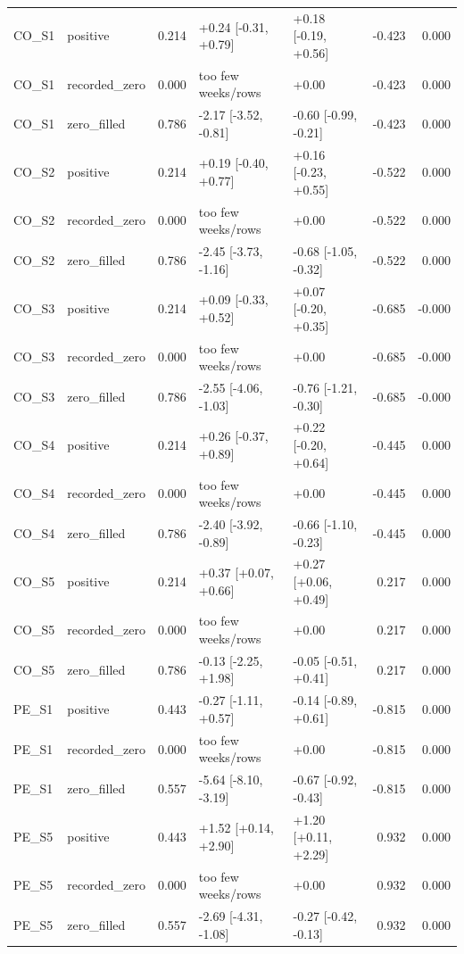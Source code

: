 \begin{tabular}{llrllrr}
CO\_S1 & positive & 0.214 & +0.24 [-0.31, +0.79] & +0.18 [-0.19, +0.56] & -0.423 & 0.000 \\
CO\_S1 & recorded\_zero & 0.000 & too few weeks/rows & +0.00 & -0.423 & 0.000 \\
CO\_S1 & zero\_filled & 0.786 & -2.17 [-3.52, -0.81] & -0.60 [-0.99, -0.21] & -0.423 & 0.000 \\
CO\_S2 & positive & 0.214 & +0.19 [-0.40, +0.77] & +0.16 [-0.23, +0.55] & -0.522 & 0.000 \\
CO\_S2 & recorded\_zero & 0.000 & too few weeks/rows & +0.00 & -0.522 & 0.000 \\
CO\_S2 & zero\_filled & 0.786 & -2.45 [-3.73, -1.16] & -0.68 [-1.05, -0.32] & -0.522 & 0.000 \\
CO\_S3 & positive & 0.214 & +0.09 [-0.33, +0.52] & +0.07 [-0.20, +0.35] & -0.685 & -0.000 \\
CO\_S3 & recorded\_zero & 0.000 & too few weeks/rows & +0.00 & -0.685 & -0.000 \\
CO\_S3 & zero\_filled & 0.786 & -2.55 [-4.06, -1.03] & -0.76 [-1.21, -0.30] & -0.685 & -0.000 \\
CO\_S4 & positive & 0.214 & +0.26 [-0.37, +0.89] & +0.22 [-0.20, +0.64] & -0.445 & 0.000 \\
CO\_S4 & recorded\_zero & 0.000 & too few weeks/rows & +0.00 & -0.445 & 0.000 \\
CO\_S4 & zero\_filled & 0.786 & -2.40 [-3.92, -0.89] & -0.66 [-1.10, -0.23] & -0.445 & 0.000 \\
CO\_S5 & positive & 0.214 & +0.37 [+0.07, +0.66] & +0.27 [+0.06, +0.49] & 0.217 & 0.000 \\
CO\_S5 & recorded\_zero & 0.000 & too few weeks/rows & +0.00 & 0.217 & 0.000 \\
CO\_S5 & zero\_filled & 0.786 & -0.13 [-2.25, +1.98] & -0.05 [-0.51, +0.41] & 0.217 & 0.000 \\
PE\_S1 & positive & 0.443 & -0.27 [-1.11, +0.57] & -0.14 [-0.89, +0.61] & -0.815 & 0.000 \\
PE\_S1 & recorded\_zero & 0.000 & too few weeks/rows & +0.00 & -0.815 & 0.000 \\
PE\_S1 & zero\_filled & 0.557 & -5.64 [-8.10, -3.19] & -0.67 [-0.92, -0.43] & -0.815 & 0.000 \\
PE\_S5 & positive & 0.443 & +1.52 [+0.14, +2.90] & +1.20 [+0.11, +2.29] & 0.932 & 0.000 \\
PE\_S5 & recorded\_zero & 0.000 & too few weeks/rows & +0.00 & 0.932 & 0.000 \\
PE\_S5 & zero\_filled & 0.557 & -2.69 [-4.31, -1.08] & -0.27 [-0.42, -0.13] & 0.932 & 0.000 \\

\end{tabular}
